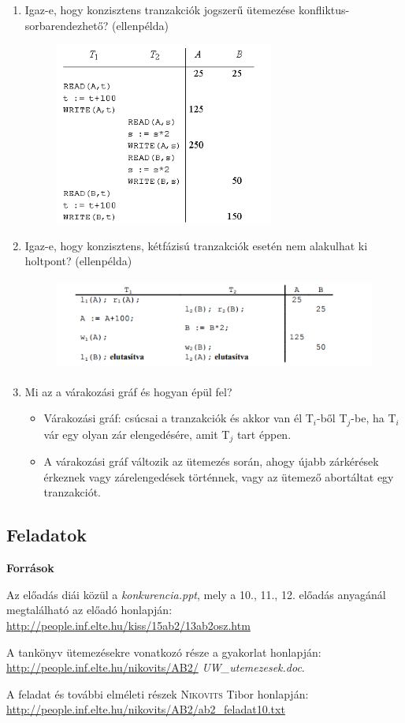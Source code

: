 \documentclass[a4paper,11.5pt, table]{article}
\begin{document}
\begin{enumerate}
		\item Igaz-e, hogy konzisztens tranzakciók jogszerű ütemezése konfliktus-sorbarendezhető? (ellenpélda)
			\begin{figure}[h]
				\centering
				\includegraphics[height = 6cm]{05.png}
			\end{figure}
		\item Igaz-e, hogy konzisztens, kétfázisú tranzakciók esetén nem alakulhat ki holtpont? (ellenpélda)
			\begin{figure}[h]
				\centering
				\includegraphics[height = 3cm]{06.png}
			\end{figure}
		\item Mi az a várakozási gráf és hogyan épül fel?
			\begin{itemize}
				\item Várakozási gráf: csúcsai a tranzakciók és akkor van él T$_{i}$-ből T$_{j}$-be, ha T$_{i}$ vár egy olyan zár elengedésére, amit T$_{j}$ tart éppen.
				\item A várakozási gráf változik az ütemezés során, ahogy újabb zárkérések érkeznek vagy zárelengedések történnek, vagy az ütemező abortáltat egy tranzakciót.
			\end{itemize}
	\end{enumerate}

\subsection{Feladatok}

	{\large \textbf{Források}}
	\begin{compactitem}
		\item Az előadás diái közül a \textit{konkurencia.ppt}, mely a 10., 11., 12. előadás anyagánál megtalálható az előadó honlapján: \url{http://people.inf.elte.hu/kiss/15ab2/13ab2osz.htm}
		 \item A tankönyv ütemezésekre vonatkozó része a gyakorlat honlapján: \url{http://people.inf.elte.hu/nikovits/AB2/} \textit{UW\_utemezesek.doc}.
		\item A feladat és további elméleti részek \textsc{Nikovits} Tibor honlapján: \url{http://people.inf.elte.hu/nikovits/AB2/ab2_feladat10.txt}
	\end{compactitem}
\end{document}
